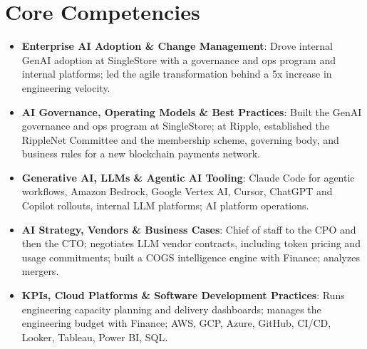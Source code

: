 \documentclass[11pt,letterpaper,sans]{moderncv}
\begin{document}
\section{Core Competencies}
\vspace{1pt}
\begin{itemize}

\item \textbf{Enterprise AI Adoption \& Change Management}: Drove internal GenAI adoption at SingleStore with a governance and ops program and internal platforms; led the agile transformation behind a 5x increase in engineering velocity.

\item \textbf{AI Governance, Operating Models \& Best Practices}: Built the GenAI governance and ops program at SingleStore; at Ripple, established the RippleNet Committee and the membership scheme, governing body, and business rules for a new blockchain payments network.

\item \textbf{Generative AI, LLMs \& Agentic AI Tooling}: Claude Code for agentic workflows, Amazon Bedrock, Google Vertex AI, Cursor, ChatGPT and Copilot rollouts, internal LLM platforms; AI platform operations.

\item \textbf{AI Strategy, Vendors \& Business Cases}: Chief of staff to the CPO and then the CTO; negotiates LLM vendor contracts, including token pricing and usage commitments; built a COGS intelligence engine with Finance; analyzes mergers.

\item \textbf{KPIs, Cloud Platforms \& Software Development Practices}: Runs engineering capacity planning and delivery dashboards; manages the engineering budget with Finance; AWS, GCP, Azure, GitHub, CI/CD, Looker, Tableau, Power BI, SQL.

\end{itemize}

\end{document}
